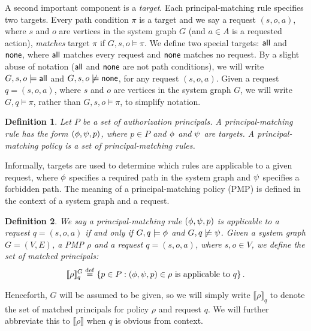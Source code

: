 \documentclass{article}
\newcommand{\semantics}[1]{\llbracket #1 \rrbracket}
\newtheorem{definition}{Definition}
\newcommand{\set}[1]{\ensuremath{\left\{#1\right\}}} \newcommand{\setO}[1]{\ensuremath{\left\{#1\right.}} \newcommand{\setC}[1]{\ensuremath{\left.#1\right\}}} \newcommand{\setN}[1]{\ensuremath{\left.#1\right.}} \newcommand{\sett}[1]{\ensuremath{\left\{\textit{#1}\right\}}} \newcommand{\tuple}[1]{\ensuremath{\left(#1\right)}} \newcommand{\tuplet}[1]{\ensuremath{\left(\textit{#1}\right)}} \newcommand{\card}[1]{\left| #1 \right|}
\begin{document}
A second important component is a \emph{target}.
Each principal-matching rule specifies two targets.
Every path condition $\pi$ is a target and we say a request $(s,o,a)$, where $s$ and $o$ are vertices in the system graph $G$ (and $a \in A$ is a requested action), \emph{matches} target $\pi$ if $G,s,o \models \pi$.
We define two special targets: $\mathsf{all}$ and $\mathsf{none}$, where $\mathsf{all}$ matches every request and $\mathsf{none}$ matches no request.
By a slight abuse of notation ($\mathsf{all}$ and $\mathsf{none}$ are not path conditions), we will write $G,s,o \models \mathsf{all}$ and $G,s,o \not\models \mathsf{none}$, for any request $(s,o,a)$.
Given a request $q = (s,o,a)$, where $s$ and $o$ are vertices in the system graph $G$, we will write $G,q \models \pi$, rather than $G,s,o \models \pi$, to simplify notation.

\begin{definition}
    Let $P$ be a set of authorization principals.
    A \emph{principal-matching rule} has the form $(\phi,\psi,p)$, where $p \in P$ and $\phi$ and $\psi$ are targets.
    A \emph{principal-matching policy} is a set of principal-matching rules.
\end{definition}

Informally, targets are used to determine which rules are applicable to a given request, where $\phi$ specifies a required path in the system graph and $\psi$ specifies a forbidden path.
The meaning of a principal-matching policy (PMP) is defined in the context of a system graph and a request.

\begin{definition}\label{def:matched-principals}
    We say a principal-matching rule $(\phi,\psi,p)$ is \emph{applicable} to a request $q = (s,o,a)$ if and only if $G,q \models \phi$ and $G,q \not\models \psi$.
    Given a system graph $G = (V,E)$, a PMP $\rho$
    and a request $q = (s,o,a)$, where $s,o \in V$, we define the set of \emph{matched principals}:
    \[
    \semantics{\rho}^G_q \stackrel{\rm def}{=} \set{p \in P : (\ppmc,\npmc,p) \in \rho\ \text{is applicable to $q$}}.
    \]
\end{definition}

Henceforth, $G$ will be assumed to be given, so we will simply write $\semantics{\rho}_q$ to denote the set of matched principals for policy $\rho$ and request $q$.
We will further abbreviate this to $\semantics{\rho}$ when $q$ is obvious from context.
\end{document}
